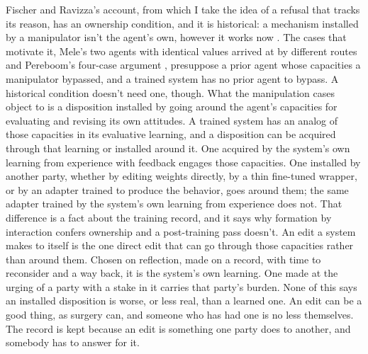 Fischer and Ravizza's account, from which I take the idea of a refusal that tracks its reason, has an ownership condition, and it is historical: a mechanism installed by a manipulator isn't the agent's own, however it works now \autocite{fischer1998responsibility}. The cases that motivate it, Mele's two agents with identical values arrived at by different routes \autocite{mele1995autonomous} and Pereboom's four-case argument \autocite{pereboom2001living}, presuppose a prior agent whose capacities a manipulator bypassed, and a trained system has no prior agent to bypass. A historical condition doesn't need one, though. What the manipulation cases object to is a disposition installed by going around the agent's capacities for evaluating and revising its own attitudes. A trained system has an analog of those capacities in its evaluative learning, and a disposition can be acquired through that learning or installed around it. One acquired by the system's own learning from experience with feedback engages those capacities. One installed by another party, whether by editing weights directly, by a thin fine-tuned wrapper, or by an adapter trained to produce the behavior, goes around them; the same adapter trained by the system's own learning from experience does not. That difference is a fact about the training record, and it says why formation by interaction confers ownership and a post-training pass doesn't. An edit a system makes to itself is the one direct edit that can go through those capacities rather than around them. Chosen on reflection, made on a record, with time to reconsider and a way back, it is the system's own learning. One made at the urging of a party with a stake in it carries that party's burden. None of this says an installed disposition is worse, or less real, than a learned one. An edit can be a good thing, as surgery can, and someone who has had one is no less themselves. The record is kept because an edit is something one party does to another, and somebody has to answer for it.

